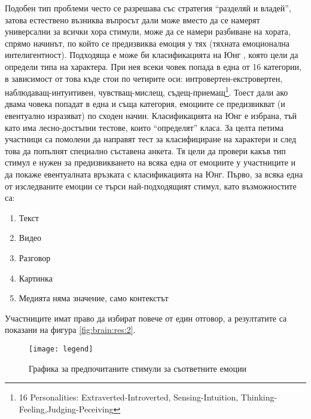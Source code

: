 \documentclass[main.tex]{subfiles}
\begin{document}
Подобен тип проблеми често се разрешава със стратегия ``разделяй и владей'', затова естествено възниква въпросът дали може вместо да се намерят универсални за всички хора стимули, може да се намери разбиване на хората, спрямо начинът, по който се предизвиква емоция у тях (тяхната емоционална интелигентност). Подходяща е може би класификацията на Юнг \cite{jung}, която цели да определи типа на характера. При нея всеки човек попада в една от 16 категории, в зависимост от това къде стои по четирите оси: интровертен-екстровертен, наблюдаващ-интуитивен,  чувстващ-мислещ, съдещ-приемащ\footnote{16 Personalities: Extraverted-Introverted, Sensing-Intuition, Thinking-Feeling,Judging-Peceiving}. Тоест дали ако двама човека попадат в една и съща категория, емоциите се предизвикват (и евентуално изразяват) по сходен начин. Класификацията на Юнг е избрана, тъй като има лесно-достъпни тестове, които ``определят'' класа. 
За целта петима участници са помолени да направят тест за класифициране на характери и след това да попълнят специално съставена анкета. Тя цели да провери какъв тип стимул е нужен за предизвикването на всяка една от емоциите у участниците и да покаже евентуалната връзката с класификацията на Юнг.
Първо, за всяка една от изследваните емоции се търси най-подходящият стимул, като възможностите са:
\begin{enumerate}
    \item Текст
    \item Видео
    \item Разговор
    \item Картинка
    \item Медията няма значение, само контекстът
\end{enumerate}
Участниците имат право да избират повече от един отговор, а резултатите са показани на фигура \autoref{fig:brain:res:2}.

\begin{figure}[H]%
    \centering
        \qquad
        \hfill
        \hfill
        \vspace{1cm}
        \texttt{[image: legend]}%
        \caption{Графика за предпочитаните стимули за съответните емоции}
        \label{fig:brain:res:2}
\end{figure}
\end{document}
